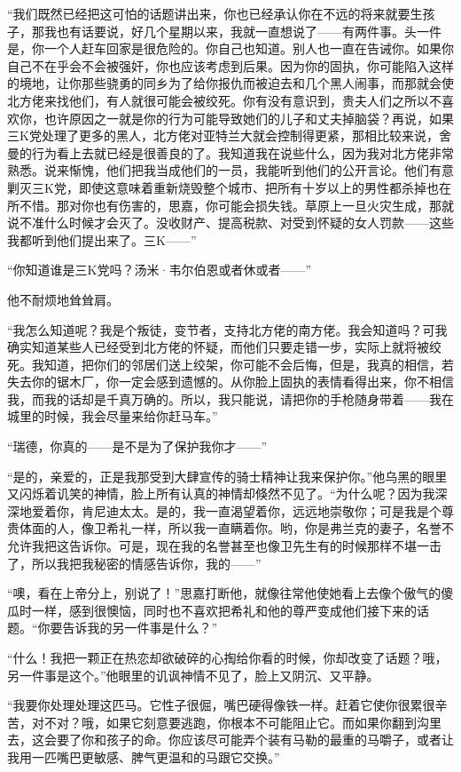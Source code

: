 \par “我们既然已经把这可怕的话题讲出来，你也已经承认你在不远的将来就要生孩子，那我也有话要说，好几个星期以来，我就一直想说了——有两件事。头一件是，你一个人赶车回家是很危险的。你自己也知道。别人也一直在告诫你。如果你自己不在乎会不会被强奸，你也应该考虑到后果。因为你的固执，你可能陷入这样的境地，让你那些骁勇的同乡为了给你报仇而被迫去和几个黑人闹事，而那就会使北方佬来找他们，有人就很可能会被绞死。你有没有意识到，贵夫人们之所以不喜欢你，也许原因之一就是你的行为可能导致她们的儿子和丈夫掉脑袋？再说，如果三K党处理了更多的黑人，北方佬对亚特兰大就会控制得更紧，那相比较来说，舍曼的行为看上去就已经是很善良的了。我知道我在说些什么，因为我对北方佬非常熟悉。说来惭愧，他们把我当成他们的一员，我能听到他们的公开言论。他们有意剿灭三K党，即使这意味着重新烧毁整个城市、把所有十岁以上的男性都杀掉也在所不惜。那对你也有伤害的，思嘉，你可能会损失钱。草原上一旦火灾生成，那就说不准什么时候才会灭了。没收财产、提高税款、对受到怀疑的女人罚款——这些我都听到他们提出来了。三K——”
\par “你知道谁是三K党吗？汤米·韦尔伯恩或者休或者——”
\par 他不耐烦地耸耸肩。
\par “我怎么知道呢？我是个叛徒，变节者，支持北方佬的南方佬。我会知道吗？可我确实知道某些人已经受到北方佬的怀疑，而他们只要走错一步，实际上就将被绞死。我知道，把你们的邻居们送上绞架，你可能不会后悔，但是，我真的相信，若失去你的锯木厂，你一定会感到遗憾的。从你脸上固执的表情看得出来，你不相信我，而我的话却是千真万确的。所以，我只能说，请把你的手枪随身带着——我在城里的时候，我会尽量来给你赶马车。”
\par “瑞德，你真的——是不是为了保护我你才——”
\par “是的，亲爱的，正是我那受到大肆宣传的骑士精神让我来保护你。”他乌黑的眼里又闪烁着讥笑的神情，脸上所有认真的神情却倏然不见了。“为什么呢？因为我深深地爱着你，肯尼迪太太。是的，我一直渴望着你，远远地崇敬你；可是我是个尊贵体面的人，像卫希礼一样，所以我一直瞒着你。哟，你是弗兰克的妻子，名誉不允许我把这告诉你。可是，现在我的名誉甚至也像卫先生有的时候那样不堪一击了，所以我把我秘密的情感告诉你，我的——”
\par “噢，看在上帝分上，别说了！”思嘉打断他，就像往常他使她看上去像个傲气的傻瓜时一样，感到很懊恼，同时也不喜欢把希礼和他的尊严变成他们接下来的话题。“你要告诉我的另一件事是什么？”
\par “什么！我把一颗正在热恋却欲破碎的心掏给你看的时候，你却改变了话题？哦，另一件事是这个。”他眼里的讥讽神情不见了，脸上又阴沉、又平静。
\par “我要你处理处理这匹马。它性子很倔，嘴巴硬得像铁一样。赶着它使你很累很辛苦，对不对？哦，如果它刻意要逃跑，你根本不可能阻止它。而如果你翻到沟里去，这会要了你和孩子的命。你应该尽可能弄个装有马勒的最重的马嚼子，或者让我用一匹嘴巴更敏感、脾气更温和的马跟它交换。”
